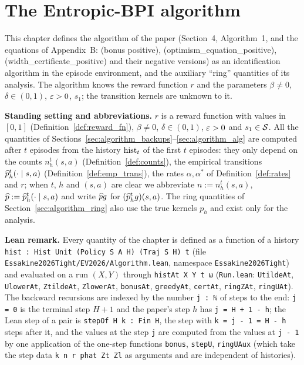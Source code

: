 \chapter{The Entropic-BPI algorithm}
\label{chap:algorithm}

This chapter defines the algorithm of the paper (Section~4, Algorithm~1, and the equations of
Appendix~B: (bonus positive), (optimism\_equation\_positive), (width\_certificate\_positive)
and their negative versions) as an identification algorithm in the episode environment, and
the auxiliary ``ring'' quantities of its analysis. The algorithm knows the reward function
$r$ and the parameters $\beta \ne 0$, $\delta \in (0, 1)$, $\varepsilon > 0$, $s_1$; the transition
kernels are unknown to it.

\textbf{Standing setting and abbreviations.} $r$ is a reward function with values in $[0, 1]$
(Definition~\ref{def:reward_fn}), $\beta \ne 0$, $\delta \in (0, 1)$, $\varepsilon > 0$ and $s_1 \in \mathcal{S}$.
All the quantities of Sections~\ref{sec:algorithm_backups}--\ref{sec:algorithm_alg} are
computed after $t$ episodes from the history $\mathrm{hist}_t$ of the first $t$ episodes: they only
depend on the counts $n_h^t(s, a)$ (Definition~\ref{def:counts}), the empirical transitions
$\widehat{p}_h^t(\cdot \mid s, a)$ (Definition~\ref{def:emp_trans}), the rates $\alpha, \alpha^*$ of
Definition~\ref{def:rates} and $r$; when $t$, $h$ and $(s, a)$ are clear we abbreviate
$n := n_h^t(s, a)$, $\widehat{p} := \widehat{p}_h^t(\cdot \mid s, a)$ and write $\widehat{p} g$ for
$(\widehat{p}_h^t g)(s, a)$. The ring quantities of Section~\ref{sec:algorithm_ring} also use the true
kernels $p_h$ and exist only for the analysis.

\textbf{Lean remark.} Every quantity of the chapter is defined as a function of a history
\texttt{hist : Hist Unit (Policy S A H) (Traj S H) t} (file \texttt{Essakine2026Tight/EV2026/Algorithm.lean},
namespace \texttt{Essakine2026Tight}) and evaluated on a run $(X, Y)$ through
\texttt{histAt X Y t ω} (\texttt{Run.lean}: \texttt{UtildeAt}, \texttt{UlowerAt},
\texttt{ZtildeAt}, \texttt{ZlowerAt}, \texttt{bonusAt}, \texttt{greedyAt}, \texttt{certAt},
\texttt{ringZAt}, \texttt{ringUAt}). The backward recursions are indexed by the number
\texttt{j : ℕ} of steps to the end: \texttt{j = 0} is the terminal step $H + 1$ and the paper's
step $h$ has \texttt{j = H + 1 - h}; the Lean step of a pair is \texttt{stepOf H k : Fin H}, the
step with \texttt{k = j - 1 = H - h} steps after it, and the values at the step \texttt{j} are
computed from the values at \texttt{j - 1} by one application of the one-step functions
\texttt{bonus}, \texttt{stepU}, \texttt{ringUAux} (which take the step data
\texttt{k n r phat Zt Zl} as arguments and are independent of histories).

